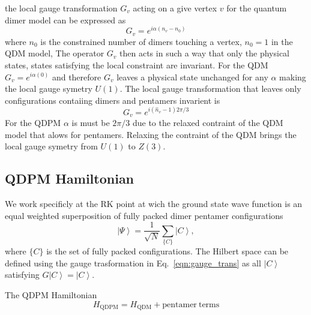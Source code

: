 \documentclass[aps,floatfix,11pt,twocolumn]{revtex4-1}
\begin{document}
        the local gauge transformation $G_v$ acting on a give vertex $v$ for the quantum dimer model
        can be expressed as
        \begin{equation}
            \label{}
            G_v=e^{i \alpha (n_v - n_0)}
        \end{equation}
        where $n_0$ is the constrained number of dimers touching a vertex, $n_0=1$ in the QDM model,
        The operator $G_v$ then acts in such a
        way that only the physical states, states satisfying the local constraint 
        are invariant. For the QDM $G_v =
        e^{i\alpha (0)}$ and therefore $G_v$ leaves a physical state unchanged for any
        $\alpha$ making the local gauge symetry $U(1)$. The local gauge transformation that leaves
        only configurations contaiing dimers and pentamers invarient is
        \begin{equation}
            \label{eqn:gauge_trans}
            G_v = e^{i (\hat{n}_v -1) 2\pi/3}    
        \end{equation}
        For the QDPM $\alpha$ is must be $2\pi/3$ due to the relaxed contraint of the QDM
        model that alows for pentamers. Relaxing the contraint of the QDM brings the local gauge
        symetry from $U(1)$ to $Z(3)$.

    \subsection{QDPM Hamiltonian}

        We work specificly at the RK point at wich the ground state wave function
        is an equal weighted superposition of fully packed dimer pentamer configurations
        \begin{equation}
            \label{}
            \left| \Psi \right\rangle = \frac{1}{\sqrt{N}}\sum_{\{C\}} \left| C \right\rangle
            ,
        \end{equation}
        where $\{C\}$ is the set of fully packed configurations. The Hilbert space can be defined
        using the gauge trasformation in Eq.~\ref{eqn:gauge_trans} as all $\left| C \right\rangle$
        satisfying $G \left| C \right\rangle = \left| C \right\rangle$.

        The QDPM Hamiltonian
        \begin{equation}
            H_{\mathrm{QDPM}} = H_{\mathrm{QDM}} + \mathrm{pentamer\ terms}
        \end{equation}
\end{document}
